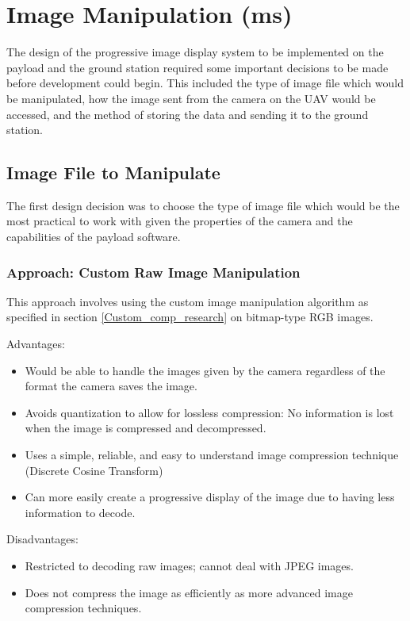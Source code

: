 \section{Image Manipulation (ms)}
\label{sec:progressiveimagedisplay}

The design of the progressive image
display system to be implemented on the
payload and the ground station required some
important decisions to be made before 
development could begin. This included
the type of image file which would be
manipulated, how the image sent from the camera on 
the UAV would be accessed,
and the method of storing the data
and sending it to the ground station.

\subsection{Image File to Manipulate}

The first design decision was to choose the type of image 
file which would be the most practical to work with given
the properties of the camera and the
capabilities of the payload software.

\subsubsection{Approach: Custom Raw Image Manipulation}

This approach involves using the custom image 
manipulation algorithm as specified 
in section \ref{Custom_comp_research} on bitmap-type RGB images.

Advantages:
\begin{itemize}
	\item Would be able to handle the images
		given by the camera regardless of the format
		the camera saves the image.
	\item Avoids quantization to allow 
		for lossless compression: No information is
		lost when the image is 
		compressed and decompressed.
	\item Uses a simple, reliable, and easy to 
		understand image compression technique
		(Discrete Cosine Transform)
	\item Can more easily create a progressive
		display of the image due to having less
		information to decode.
\end{itemize}

Disadvantages:
\begin{itemize}
	\item Restricted to decoding raw images; 
		cannot deal with JPEG images.
	\item Does not compress the image as 
		efficiently as more advanced 
		image compression techniques.
\end{itemize}

